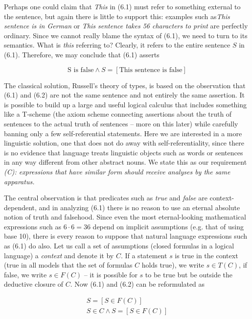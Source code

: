 \noindent 
Perhaps one could claim that {\it This} in (6.1) must refer to something
external to the sentence, but again there is little to support this: examples
such as{\it This sentence is in German} or {\it This sentence takes 56
  characters to print} are perfectly ordinary.  Since we cannot really blame
the syntax of (6.1), we need to turn to its semantics. What is {\it this}
referring to? Clearly, it refers to the entire sentence $S$ in (6.1).
Therefore, we may conclude that (6.1) asserts

\begin{equation}
\mbox{S is false} \wedge S=[\mbox{This sentence is false}]
\end{equation}

\noindent 
The classical solution, Russell's theory of types, is based on the observation
that (6.1) and (6.2) are not the same sentence and not entirely the same
assertion. It is possible to build up a large and useful logical calculus that
includes something like a T-scheme (the axiom scheme connecting assertions
about the truth of sentences to the actual truth of sentences -- more on this
later) while carefully banning only a few self-referential statements.  Here
we are interested in a more linguistic solution, one that does not do away
with self-referentiality, since there is no evidence that language treats
linguistic objects such as words or sentences in any way different from other
abstract nouns. We state this as our requirement {\sl (C): expressions that
  have similar form should receive analyses by the same apparatus.}

The central observation is that predicates such as {\it true} and {\it false}
are context-dependent, and in analyzing (6.1) there is no reason to use an
eternal absolute notion of truth and falsehood. Since even the most
eternal-looking mathematical expressions such as $6 \cdot 6 = 36$ depend on
implicit assumptions (e.g. that of using base 10), there is every reason to
suppose that natural language expressions such as (6.1) do also. Let us call a
set of assumptions (closed formulas in a logical language) a {\it context} and
denote it by $C$. If a statement $s$ is true in the context (true in all
models that the set of formulas $C$ holds true), we write $s \in T(C)$, if
false, we write $s \in F(C)$ -- it is possible for $s$ to be true but be
outside the deductive closure of $C$.  Now (6.1) and (6.2) can be reformulated
as

\begin{eqnarray}
S=[S \in F(C)] \\
S \in C \wedge S = [S \in F(C)]
\end{eqnarray} 

